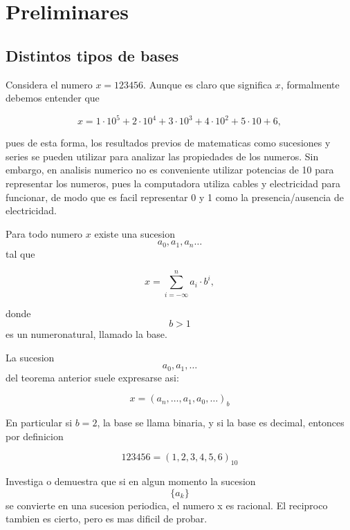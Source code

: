 \documentclass[spanish]{amsart}
\begin{document}
\maketitle
\section{Preliminares}

\subsection{Distintos tipos de bases}

Considera el numero $x = 123456$. Aunque es claro que significa $x$, formalmente debemos entender que 

\[x = 1 \cdot 10^5 + 2 \cdot 10^4 + 3 \cdot 10^3 + 4 \cdot 10^2 + 5 \cdot 10 + 6,\]

pues de esta forma, los resultados previos de matematicas como sucesiones y series se pueden utilizar para analizar las propiedades de los numeros. Sin embargo, en analisis numerico no es conveniente utilizar potencias de 10 para representar los numeros, pues la computadora utiliza cables y electricidad para funcionar, de modo que es facil representar 0 y  1 como la presencia/ausencia de electricidad.

\begin{theorem}
Para todo numero $x$ existe una sucesion \[a_0, a_1, a_n\ldots\] tal que 

\[x = \sum_{i = -\infty}^n a_i\cdot b^i,\]

donde \[b > 1 \] es un numeronatural, llamado la base.  
\end{theorem}

La sucesion \[a_0, a_1, \ldots\] del teorema anterior suele expresarse asi:

\[x = (a_n, \ldots, a_1, a_0, \ldots)_b\]

En particular si $b = 2$, la base se llama binaria, y si la base es decimal, entonces por definicion

\[123456 = (1, 2, 3, 4, 5, 6)_{10}\]

\begin{exercise}
Investiga o demuestra que si en algun momento la sucesion \[\{a_k\}\] se convierte en una sucesion periodica, el numero x es racional. El reciproco tambien es cierto, pero es mas dificil de probar.
\end{exercise}
\end{document}
